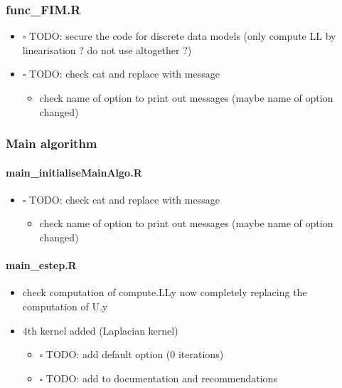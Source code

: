 \documentclass[
]{article}
\providecommand{\tightlist}{%
  \setlength{\itemsep}{0pt}\setlength{\parskip}{0pt}}
\begin{document}
\hypertarget{func_fim.r}{%
\subsubsection{func\_FIM.R}\label{func_fim.r}}

\begin{itemize}
\tightlist
\item
  \(\square\) TODO: secure the code for discrete data models (only
  compute LL by linearisation ? do not use altogether ?)
\item
  \(\square\) TODO: check cat and replace with message

  \begin{itemize}
  \tightlist
  \item
    check name of option to print out messages (maybe name of option
    changed)
  \end{itemize}
\end{itemize}

\hypertarget{main-algorithm}{%
\subsubsection{Main algorithm}\label{main-algorithm}}

\hypertarget{main_initialisemainalgo.r}{%
\paragraph{main\_initialiseMainAlgo.R}\label{main_initialisemainalgo.r}}

\begin{itemize}
\tightlist
\item
  \(\square\) TODO: check cat and replace with message

  \begin{itemize}
  \tightlist
  \item
    check name of option to print out messages (maybe name of option
    changed)
  \end{itemize}
\end{itemize}

\hypertarget{main_estep.r}{%
\paragraph{main\_estep.R}\label{main_estep.r}}

\begin{itemize}
\tightlist
\item
  check computation of compute.LLy now completely replacing the
  computation of U.y
\item
  4th kernel added (Laplacian kernel)

  \begin{itemize}
  \tightlist
  \item
    \(\square\) TODO: add default option (0 iterations)
  \item
    \(\square\) TODO: add to documentation and recommendations
  \end{itemize}
\end{itemize}
\end{document}
